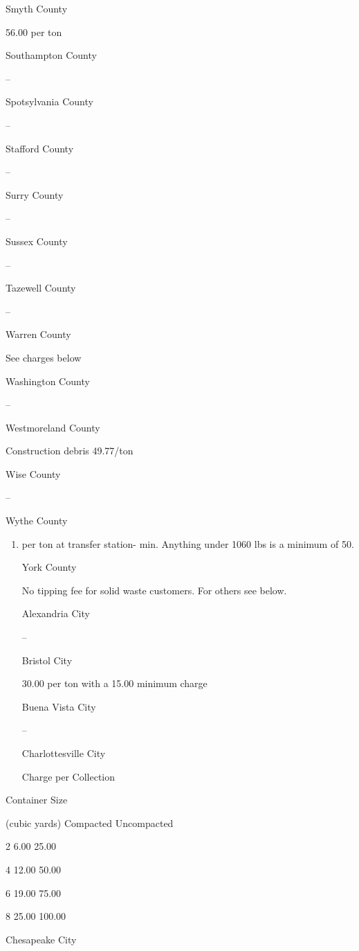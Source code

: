 \documentclass[
]{book}
\providecommand{\tightlist}{%
  \setlength{\itemsep}{0pt}\setlength{\parskip}{0pt}}
\begin{document}
Smyth County

56.00 per ton

Southampton County

--

Spotsylvania County

--

Stafford County

--

Surry County

--

Sussex County

--

Tazewell County

--

Warren County

See charges below

Washington County

--

Westmoreland County

Construction debris 49.77/ton

Wise County

--

Wythe County

\begin{enumerate}
\def\labelenumi{\arabic{enumi}.}
\setcounter{enumi}{51}
\tightlist
\item
  per ton at transfer station- min. Anything under 1060 lbs is a minimum of 50.

  York County

  No tipping fee for solid waste customers. For others see below.

  Alexandria City

  --

  Bristol City

  30.00 per ton with a 15.00 minimum charge

  Buena Vista City

  --

  Charlottesville City

  Charge per Collection
\end{enumerate}

Container Size

(cubic yards) Compacted Uncompacted

2 6.00 25.00

4 12.00 50.00

6 19.00 75.00

8 25.00 100.00

Chesapeake City
\end{document}
